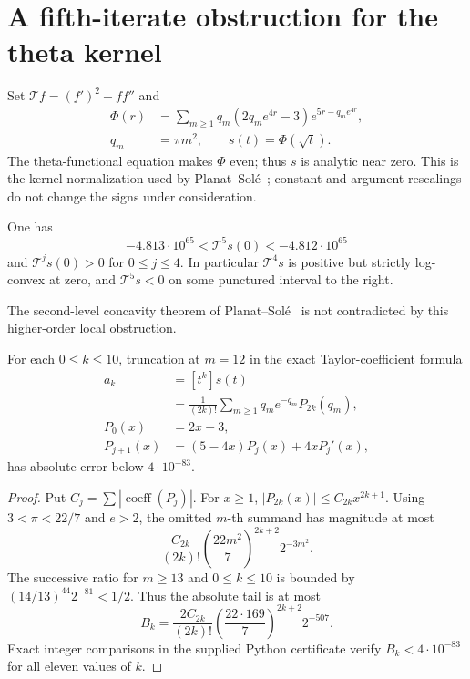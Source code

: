 \section{A fifth-iterate obstruction for the theta kernel}
Set $\mathcal Tf=(f')^2-ff''$ and
\begin{align*}
\Phi(r)&=\sum_{m\ge1}q_m(2q_me^{4r}-3)e^{5r-q_me^{4r}},\\
q_m&=\pi m^2,\qquad s(t)=\Phi(\sqrt t).
\end{align*}
The theta-functional equation makes $\Phi$ even; thus $s$ is analytic
near zero. This is the kernel normalization used by
Planat--Sol\'e~\cite{PS}; constant and argument rescalings do not
change the signs under consideration.

\begin{theorem}\label{thm:five}
One has
\[
-4.813\cdot 10^{65}<\mathcal T^5s(0)
<-4.812\cdot10^{65}
\]
and $\mathcal T^js(0)>0$ for $0\le j\le4$. In particular
$\mathcal T^4s$ is positive but strictly log-convex at zero,
and $\mathcal T^5s<0$ on some punctured interval to the right.
\end{theorem}
The second-level concavity theorem of Planat--Sol\'e~\cite{PS}
is not contradicted by this higher-order local obstruction.

\begin{lemma}
For each $0\le k\le10$, truncation at $m=12$ in the exact
Taylor-coefficient formula
\begin{align*}
a_k&=[t^k]s(t)\\
&=\frac1{(2k)!}\sum_{m\ge1}q_me^{-q_m}P_{2k}(q_m),\\
P_0(x)&=2x-3,\\
P_{j+1}(x)&=(5-4x)P_j(x)+4xP_j'(x),
\end{align*}
has absolute error below $4\cdot10^{-83}$.
\end{lemma}
\begin{proof}
Put $C_j=\sum|\operatorname{coeff}(P_j)|$.
For $x\ge1$, $|P_{2k}(x)|\le C_{2k}x^{2k+1}$.
Using $3<\pi<22/7$ and $e>2$, the omitted $m$-th
summand has magnitude at most
\[
\frac{C_{2k}}{(2k)!}
\left(\frac{22m^2}7\right)^{2k+2}2^{-3m^2}.
\]
The successive ratio for $m\ge13$ and $0\le k\le10$ is
bounded by $(14/13)^{44}2^{-81}<1/2$.
Thus the absolute tail is at most
\[
B_k=\frac{2C_{2k}}{(2k)!}
\left(\frac{22\cdot169}7\right)^{2k+2}2^{-507}.
\]
Exact integer comparisons in the supplied Python certificate verify
$B_k<4\cdot10^{-83}$ for all eleven values of $k$.
\end{proof}

